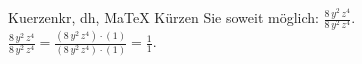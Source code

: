 \begin{MAufgabe}{Kuerzen}{kr, dh, MaTeX}
K\"urzen Sie soweit m\"oglich: $\frac{8\, y^2\, z^4}{8\, y^2\, z^4}$.\\ 
\ifLsg\MLoesung
\quad $\frac{8\, y^2\, z^4}{8\, y^2\, z^4}=\frac{(8\, y^2\, z^4)\cdot(1)}{(8\, y^2\, z^4)\cdot(1)}=\frac{1}{1}$.\else\relax\fi
 \end{MAufgabe}